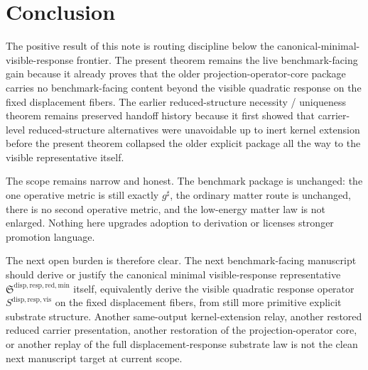 \documentclass[11pt]{article}
\newcommand{\CompletedMetric}{g^{\sharp}}
\newcommand{\MinimalReducedStructure}{\mathfrak S^{\mathrm{disp,resp,red,min}}}
\newcommand{\VisibleResponseOperator}{S^{\mathrm{disp,resp,vis}}}
\begin{document}
\section{Conclusion}

The positive result of this note is routing discipline below the canonical-minimal-visible-response frontier. The present theorem remains the live benchmark-facing gain because it already proves that the older projection-operator-core package carries no benchmark-facing content beyond the visible quadratic response on the fixed displacement fibers. The earlier reduced-structure necessity / uniqueness theorem remains preserved handoff history because it first showed that carrier-level reduced-structure alternatives were unavoidable up to inert kernel extension before the present theorem collapsed the older explicit package all the way to the visible representative itself.

The scope remains narrow and honest. The benchmark package is unchanged: the one operative metric is still exactly \(\CompletedMetric\), the ordinary matter route is unchanged, there is no second operative metric, and the low-energy matter law is not enlarged. Nothing here upgrades adoption to derivation or licenses stronger promotion language.

The next open burden is therefore clear. The next benchmark-facing manuscript should derive or justify the canonical minimal visible-response representative \(\MinimalReducedStructure\) itself, equivalently derive the visible quadratic response operator \(\VisibleResponseOperator\) on the fixed displacement fibers, from still more primitive explicit substrate structure. Another same-output kernel-extension relay, another restored reduced carrier presentation, another restoration of the projection-operator core, or another replay of the full displacement-response substrate law is not the clean next manuscript target at current scope.
\end{document}

